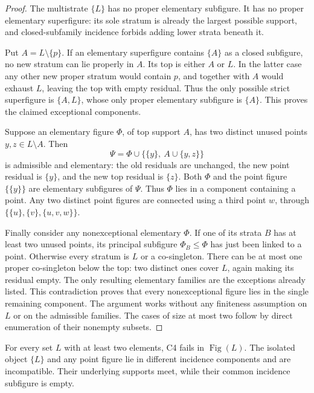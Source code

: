 \begin{proof}
The multistrate \(\{L\}\) has no proper elementary subfigure.
It has no proper elementary superfigure: its sole stratum is
already the largest possible support, and closed-subfamily
incidence forbids adding lower strata beneath it.

Put \(A=L\setminus\{p\}\). If an elementary superfigure
contains \(\{A\}\) as a closed subfigure, no new stratum can lie
properly in \(A\). Its top is either \(A\) or \(L\).
In the latter case any other new proper stratum would contain
\(p\), and together with \(A\) would exhaust \(L\), leaving
the top with empty residual. Thus the only possible strict
superfigure is \(\{A,L\}\), whose only proper elementary
subfigure is \(\{A\}\). This proves the claimed exceptional
components.

Suppose an elementary figure \(\Phi\), of top support \(A\),
has two distinct unused points \(y,z\in L\setminus A\).
Then
\[
 \Psi=\Phi\cup\bigl\{\{y\},\ A\cup\{y,z\}\bigr\}
\]
is admissible and elementary: the old residuals are unchanged,
the new point residual is \(\{y\}\), and the new top residual
is \(\{z\}\). Both \(\Phi\) and the point figure \(\{\{y\}\}\)
are elementary subfigures of \(\Psi\). Thus \(\Phi\) lies in
a component containing a point. Any two distinct point figures
are connected using a third point \(w\), through
\(\{\{u\},\{v\},\{u,v,w\}\}\).

Finally consider any nonexceptional elementary \(\Phi\).
If one of its strata \(B\) has at least two unused points,
its principal subfigure \(\Phi_B\leq\Phi\) has just been linked
to a point. Otherwise every stratum is \(L\) or a co-singleton.
There can be at most one proper co-singleton below the top:
two distinct ones cover \(L\), again making its residual empty.
The only resulting elementary families are the exceptions
already listed. This contradiction proves that every
nonexceptional figure lies in the single remaining component.
The argument works without any finiteness assumption on \(L\)
or on the admissible families. The cases of size at most two
follow by direct enumeration of their nonempty subsets.
\end{proof}

\begin{corollary}
\label{SA21-B-C4-false}
For every set \(L\) with at least two elements, C4 fails in
\(\operatorname{Fig}(L)\). The isolated object \(\{L\}\)
and any point figure lie in different incidence components
and are incompatible. Their underlying supports meet, while
their common incidence subfigure is empty.
\end{corollary}

